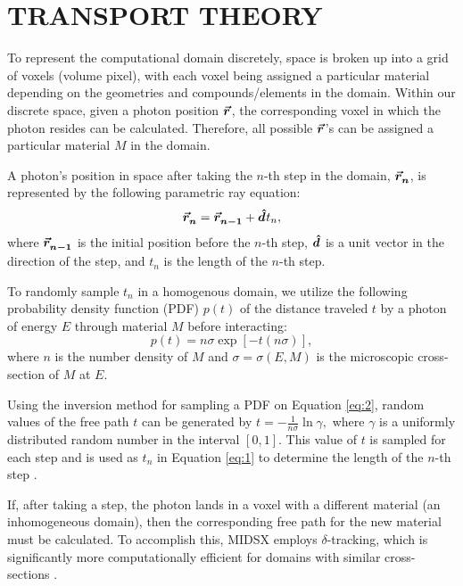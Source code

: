 \section{TRANSPORT THEORY}
\par To represent the computational domain discretely, space is broken up into a grid of voxels (volume pixel), with each voxel being assigned a particular material depending on the geometries and compounds/elements in the domain. Within our discrete space, given a photon position $\bm{\vec{r}_{}^{}}$, the corresponding voxel in which the photon resides can be calculated. Therefore, all possible $\bm{\vec{r}_{}^{}}$'s can be assigned a particular material $M$ in the domain.

\par A photon's position in space after taking the $n$-th step in the domain, $\bm{\vec{r}_{n}^{}}$, is represented by the following parametric ray equation:
\begin{equation} \label{eq:1}
    \bm{\vec{r}_{n}^{}} = \bm{\vec{r}_{n-1}^{}} + \bm{\hat{d}_{}^{}} t_n,
\end{equation}
where $\bm{\vec{r}_{n-1}^{}}$ is the initial position before the $n$-th step, $\bm{\hat{d}_{}^{}}$ is a unit vector in the direction of the step, and $t_n$ is the length of the $n$-th step.

\par To randomly sample $t_n$ in a homogenous domain, we utilize the following probability density function (PDF) $p(t)$ of the distance traveled $t$ by a photon of energy $E$ through material $M$ before interacting:
\begin{equation} \label{eq:2}
    p(t) = n\sigma \exp{\left[-t(n\sigma)\right]},
\end{equation}
where $n$ is the number density of $M$ and $\sigma = \sigma(E, M)$ is the microscopic cross-section of $M$ at $E$.
\par Using the inversion method for sampling a PDF on Equation \ref{eq:2}, random values of the free path $t$ can be generated by $
    t = -\frac{1}{n\sigma} \ln \gamma, 
    $
where $\gamma$ is a uniformly distributed random number in the interval $[0, 1]$. This value of $t$ is sampled for each step and is used as $t_n$ in Equation \ref{eq:1} to determine the length of the $n$-th step \cite{vassiliev_monte_2017}.
\par If, after taking a step, the photon lands in a voxel with a different material (an inhomogeneous domain), then the corresponding free path for the new material must be calculated. To accomplish this, MIDSX employs $\delta$-tracking, which is significantly more computationally efficient for domains with similar cross-sections \cite{vassiliev_monte_2017}.


